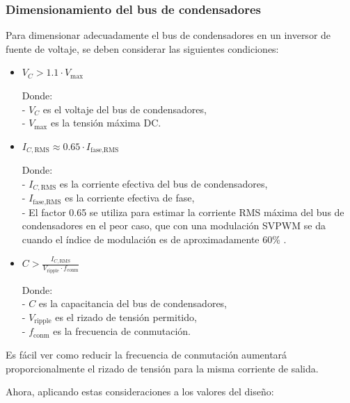 \subsubsection{Dimensionamiento del bus de condensadores}

Para dimensionar adecuadamente el bus de condensadores en un inversor de fuente de voltaje, se deben considerar las siguientes condiciones:

\begin{itemize}
	\item \( V_C > 1.1 \cdot V_{\text{max}} \)
	
	Donde:\\
	- \( V_C \) es el voltaje del bus de condensadores,\\
	- \( V_{\text{max}} \) es la tensión máxima DC.\\
	
	\item \( I_{C,\text{RMS}} \approx 0.65 \cdot I_{\text{fase,RMS}} \)
	
	Donde:\\
	- \( I_{C,\text{RMS}} \) es la corriente efectiva del bus de condensadores,\\
	- \( I_{\text{fase,RMS}} \) es la corriente efectiva de fase,\\
	- El factor 0.65 se utiliza para estimar la corriente RMS máxima del bus de condensadores en el peor caso, que con una modulación SVPWM se da cuando el índice de modulación es de aproximadamente 60\% \cite{Sylvestre_2020}.\\
	
	\item \( C > \frac{I_{C,\text{RMS}}}{V_{\text{ripple}} \cdot f_{\text{conm}}} \)
	
	Donde:\\
	- \( C \) es la capacitancia del bus de condensadores,\\
	- \( V_{\text{ripple}} \) es el rizado de tensión permitido,\\
	- \( f_{\text{conm}} \) es la frecuencia de conmutación.\\
\end{itemize}

Es fácil ver como reducir la frecuencia de conmutación aumentará proporcionalmente el rizado de tensión para la misma corriente de salida.

Ahora, aplicando estas consideraciones a los valores del diseño:

